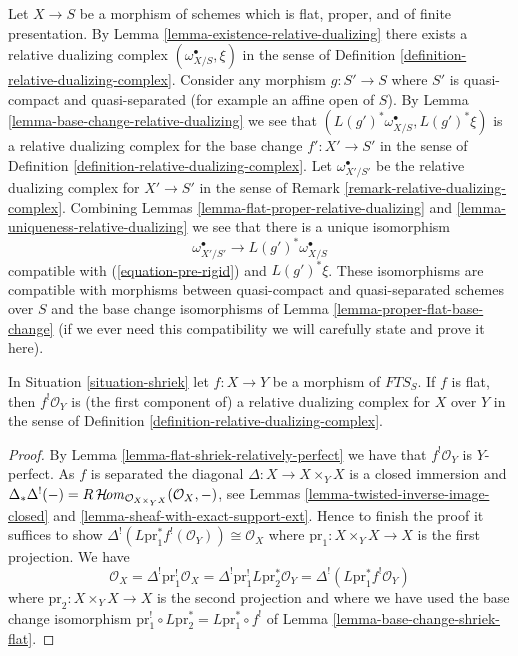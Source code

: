 \begin{remark}
\label{remark-relative-dualizing-complex-bis}
Let $X \to S$ be a morphism of schemes which is flat, proper, and
of finite presentation. By Lemma \ref{lemma-existence-relative-dualizing}
there exists a relative dualizing complex $(\omega_{X/S}^\bullet, \xi)$
in the sense of Definition \ref{definition-relative-dualizing-complex}.
Consider any morphism $g : S' \to S$ where $S'$ is quasi-compact and
quasi-separated (for example an affine open of $S$).
By Lemma \ref{lemma-base-change-relative-dualizing}
we see that $(L(g')^*\omega_{X/S}^\bullet, L(g')^*\xi)$ is
a relative dualizing complex for the base change $f' : X' \to S'$
in the sense of Definition \ref{definition-relative-dualizing-complex}.
Let $\omega_{X'/S'}^\bullet$ be the relative dualizing complex
for $X' \to S'$ in the sense of Remark \ref{remark-relative-dualizing-complex}.
Combining Lemmas \ref{lemma-flat-proper-relative-dualizing} and
\ref{lemma-uniqueness-relative-dualizing}
we see that there is a unique isomorphism
$$
\omega_{X'/S'}^\bullet \longrightarrow L(g')^*\omega_{X/S}^\bullet
$$
compatible with (\ref{equation-pre-rigid}) and $L(g')^*\xi$.
These isomorphisms are compatible with morphisms between
quasi-compact and quasi-separated schemes over $S$
and the base change isomorphisms of Lemma \ref{lemma-proper-flat-base-change}
(if we ever need this compatibility we will carefully state and prove
it here).
\end{remark}

\begin{lemma}
\label{lemma-compactifyable-relative-dualizing}
In Situation \ref{situation-shriek} let $f : X \to Y$
be a morphism of $\textit{FTS}_S$. If $f$ is flat, then
$f^!\mathcal{O}_Y$ is (the first component of)
a relative dualizing complex for $X$ over $Y$ in the sense of
Definition \ref{definition-relative-dualizing-complex}.
\end{lemma}

\begin{proof}
By Lemma \ref{lemma-flat-shriek-relatively-perfect}
we have that $f^!\mathcal{O}_Y$
is $Y$-perfect. As $f$ is separated the diagonal
$\Delta : X \to X \times_Y X$ is a closed immersion and
$\Delta_*\Delta^!(-) =
R\mathop{\mathcal{H}\!\mathit{om}}\nolimits_{\mathcal{O}_{X \times_Y X}}(\mathcal{O}_X, -)$, see
Lemmas
\ref{lemma-twisted-inverse-image-closed} and
\ref{lemma-sheaf-with-exact-support-ext}.
Hence to finish the proof it suffices to show
$\Delta^!(L\text{pr}_1^*f^!(\mathcal{O}_Y)) \cong \mathcal{O}_X$
where $\text{pr}_1 : X \times_Y X \to X$ is the first projection.
We have
$$
\mathcal{O}_X = \Delta^! \text{pr}_1^!\mathcal{O}_X =
\Delta^! \text{pr}_1^! L\text{pr}_2^*\mathcal{O}_Y =
\Delta^!(L\text{pr}_1^* f^!\mathcal{O}_Y)
$$
where $\text{pr}_2 : X \times_Y X \to X$ is the second projection
and where we have used the base change isomorphism
$\text{pr}_1^! \circ L\text{pr}_2^* = L\text{pr}_1^* \circ f^!$ of
Lemma \ref{lemma-base-change-shriek-flat}.
\end{proof}

